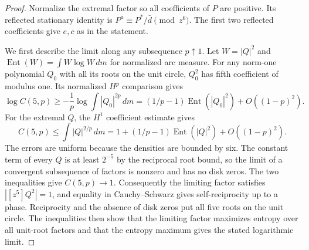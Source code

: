 \documentclass[11pt]{article}
\begin{document}
\begin{proof}
Normalize the extremal factor so all coefficients of \(P\) are
positive. Its reflected stationary identity is \(P^a\equiv P^*/\bar d\pmod{z^6}\).
The first two reflected coefficients give \(e,c\) as in the statement.

We first describe the limit along any subsequence \(p\uparrow1\).
Let \(W=|Q|^2\) and \(\operatorname{Ent}(W)=\int W\log W\,dm\)
for normalized arc measure. For any norm-one polynomial \(Q_0\)
with all its roots on the unit circle, \(Q_0^2\) has fifth
coefficient of modulus one. Its normalized \(H^p\) comparison
gives
\[
 \log C(5,p)\ge -\frac1p\log\int |Q_0|^{2p}\,dm
      =(1/p-1)\operatorname{Ent}(|Q_0|^2)+O((1-p)^2).
\]
For the extremal \(Q\), the \(H^1\) coefficient estimate gives
\[
 C(5,p)\le \int |Q|^{2/p}\,dm
      =1+(1/p-1)\operatorname{Ent}(|Q|^2)+O((1-p)^2).
\]
The errors are uniform because the densities are bounded by six.
The constant term of every \(Q\) is at least \(2^{-5}\) by the
reciprocal root bound, so the limit of a convergent subsequence
of factors is nonzero and has no disk zeros. The two inequalities
give \(C(5,p)\to1\). Consequently the limiting factor satisfies
\(|[z^5]Q^2|=1\), and equality in Cauchy--Schwarz gives
self-reciprocity up to a phase. Reciprocity and the absence of
disk zeros put all five roots on the unit circle. The inequalities
then show that the limiting factor maximizes entropy over all
unit-root factors and that the entropy maximum gives the stated
logarithmic limit.


\end{proof}
\end{document}
